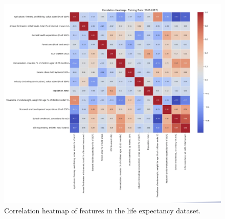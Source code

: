\documentclass{article}
\begin{document}
\begin{figure}[h]
    \centering
    \includegraphics[width=0.8\columnwidth]{./pic/T1.a.2.png} %
    \caption{Correlation heatmap of features in the life expectancy dataset.}
    \label{fig:correlation_heatmap7}
\end{figure}
\end{document}
